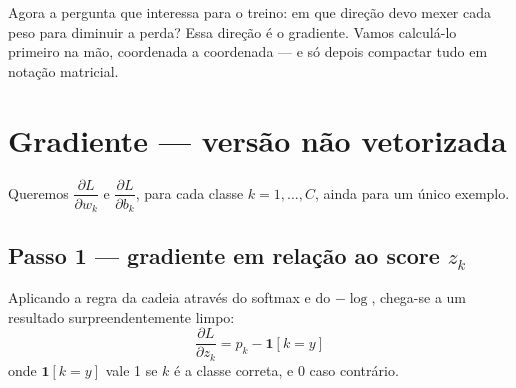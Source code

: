 \documentclass[11pt]{article}
\begin{document}
Agora a pergunta que interessa para o treino: em que direção devo mexer cada peso para diminuir a perda? Essa direção é o gradiente. Vamos calculá-lo primeiro na mão, coordenada a coordenada --- e só depois compactar tudo em notação matricial.

\section{Gradiente --- versão não vetorizada}

Queremos $\dfrac{\partial L}{\partial w_k}$ e $\dfrac{\partial L}{\partial b_k}$, para cada classe $k=1,\dots,C$, ainda para um único exemplo.

\subsection*{Passo 1 --- gradiente em relação ao score $z_k$}

Aplicando a regra da cadeia através do softmax e do $-\log$, chega-se a um resultado surpreendentemente limpo:
$$
\frac{\partial L}{\partial z_k} = p_k - \mathbf{1}[k=y]
$$
onde $\mathbf{1}[k=y]$ vale 1 se $k$ é a classe correta, e 0 caso contrário.
\end{document}
